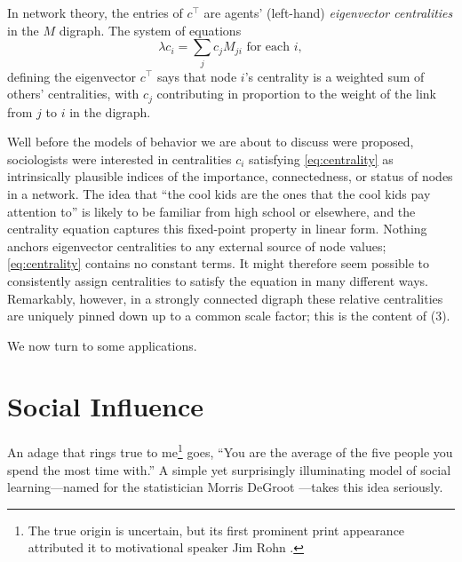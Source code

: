 \documentclass{notices}
\theoremstyle{definition}\newtheorem{problem}{Problem}
\theoremstyle{definition} \newtheorem{remark}{Remark}
\theoremstyle{definition} \newtheorem{claim}{Claim}
\theoremstyle{definition} \newtheorem{thm}{Theorem}
\theoremstyle{definition} \newtheorem*{thmNoNum}{Theorem}
\theoremstyle{definition} \newtheorem{definition}{Definition}
\theoremstyle{definition} \theoremstyle{remark}
\theoremstyle{definition} \newtheorem{note}{Note}
\theoremstyle{definition} \newtheorem{notation}{Notation}
\theoremstyle{definition} \theoremstyle{plain}
\theoremstyle{definition} \newtheorem{condition}{Condition}
\theoremstyle{definition} \newtheorem{lem}{Lemma}
\theoremstyle{definition} \newtheorem{corollary}{Corollary}
\theoremstyle{definition} \newtheorem{prop}{Proposition}
\theoremstyle{definition} \newtheorem{ax}{Axiom}
\theoremstyle{definition} \newtheorem{assumption}{Assumption}
\theoremstyle{definition} \newtheorem{example}{Example}
\theoremstyle{definition} \newtheorem{rmk}{Remark}
\theoremstyle{definition} \newtheorem{res}{Result}
\theoremstyle{definition} \newtheorem{que}{Question}
\theoremstyle{definition} \newtheorem{conjecture}{Conjecture}
\theoremstyle{definition}
\begin{document}
In network theory, the entries of $c^\top$ are agents' (left-hand) \emph{eigenvector centralities} in the $M$ digraph. The system of equations \begin{equation} \label{eq:centrality} \lambda c_i=\sum_j c_j M_{ji}  \text{ for each $i$},\end{equation} defining the eigenvector $c^\top$ says that node $i$'s centrality is a weighted sum of others' centralities, with $c_j$ contributing in proportion to the weight of the link from $j$ to $i$ in the digraph.

Well before the models of behavior we are about to discuss were proposed, sociologists were interested in centralities $c_i$ satisfying \cref{eq:centrality} as intrinsically plausible indices of the importance, connectedness, or status of nodes in a network. The idea that ``the cool kids are the ones that the cool kids pay attention to'' is likely to be familiar from high school or elsewhere, and the centrality equation captures this fixed-point property in linear form. Nothing anchors eigenvector centralities to any external source of node values; \cref{eq:centrality} contains no constant terms. It might therefore seem possible to consistently assign centralities to satisfy the equation in many different ways. Remarkably, however, in a strongly connected digraph these relative centralities are uniquely pinned down up to a common scale factor; this is the content of (3). 

We now turn to some applications.



\section*{Social Influence}

An adage that rings true to me\footnote{The true origin is uncertain, but its first prominent print appearance attributed it to motivational speaker Jim Rohn \cite{canfield2005success}.} goes, ``You are the average of the five people you spend the most time with.'' A simple yet surprisingly illuminating model of social learning---named for the statistician Morris DeGroot \cite{degroot1974reaching}---takes this idea seriously.
\end{document}
